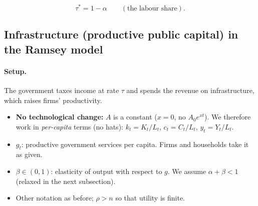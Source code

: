 \begin{keybox}[title={Revenue-maximising tax rate}]
\[
\tau^*=1-\alpha\qquad(\text{the labour share}).
\]
\end{keybox}

\subsection{Infrastructure (productive public capital) in the Ramsey model }

\paragraph{Setup.} The government taxes income at rate $\tau$ and spends the revenue on infrastructure, which raises firms' productivity.
\begin{itemize}
\item \textbf{No technological change:} $A$ is a constant ($x=0$, no $A_0e^{xt}$). We therefore work in \emph{per-capita} terms (no hats): $k_t=K_t/L_t$, $c_t=C_t/L_t$, $y_t=Y_t/L_t$.
\item $g_t$: productive government services per capita. Firms and households take it as given.
\item $\beta\in(0,1)$: elasticity of output with respect to $g$. We assume $\alpha+\beta<1$ (relaxed in the next subsection).
\item Other notation as before; $\rho>n$ so that utility is finite.
\end{itemize}

